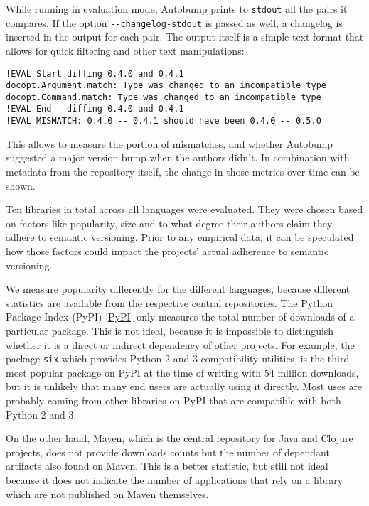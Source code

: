 \documentclass{l4proj}
\newcommand\genericstyle{\lstset{basicstyle=\ttm}}
\newcommand\codeinline[1]{{\genericstyle\lstinline!#1!}}
\begin{document}
While running in evaluation mode, Autobump prints to
\codeinline{stdout} all the pairs it compares. If the option
\codeinline{--changelog-stdout} is passed as well, a changelog is
inserted in the output for each pair. The output itself is a simple
text format that allows for quick filtering and other text
manipulations:

\begin{center}
\begin{BVerbatim}
!EVAL Start diffing 0.4.0 and 0.4.1
docopt.Argument.match: Type was changed to an incompatible type
docopt.Command.match: Type was changed to an incompatible type
!EVAL End   diffing 0.4.0 and 0.4.1
!EVAL MISMATCH: 0.4.0 -- 0.4.1 should have been 0.4.0 -- 0.5.0
\end{BVerbatim}
\end{center}

This allows to measure the portion of mismatches, and whether Autobump
suggested a major version bump when the authors didn't. In combination
with metadata from the repository itself, the change in those metrics
over time can be shown.

Ten libraries in total across all languages were evaluated. They were
chosen based on factors like popularity, size and to what degree their
authors claim they adhere to semantic versioning. Prior to any
empirical data, it can be speculated how those factors could impact
the projects' actual adherence to semantic versioning.

We measure popularity differently for the different languages, because
different statistics are available from the respective central
repositories. The Python Package Index (PyPI) \ref{PyPI} only measures
the total number of downloads of a particular package. This is not
ideal, because it is impossible to distinguish whether it is a direct
or indirect dependency of other projects. For example, the package
\codeinline{six} which provides Python 2 and 3 compatibility
utilities, is the third-most popular package on PyPI at the time of
writing with 54 million downloads, but it is unlikely that many end
users are actually using it directly. Most uses are probably coming
from other libraries on PyPI that are compatible with both Python 2
and 3.

On the other hand, Maven, which is the central repository for Java and
Clojure projects, does not provide downloads counts but the number of
dependant artifacts also found on Maven. This is a better statistic,
but still not ideal because it does not indicate the number of
applications that rely on a library which are not published on Maven
themselves.
\end{document}
